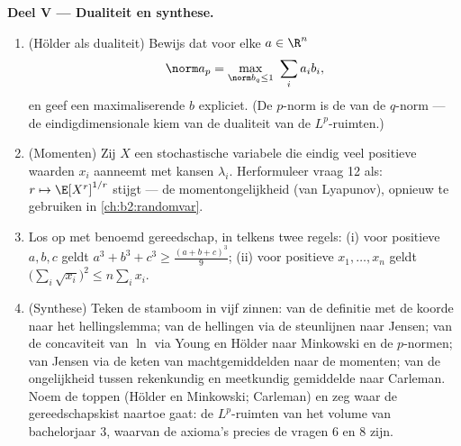 \begin{problem}
\medskip
\noindent\textbf{Deel V --- Dualiteit en synthese.}
\begin{enumerate}[resume]
  \item (Hölder als dualiteit) Bewijs dat voor elke $a \in \R^n$
        \[
        \norm a_p = \max_{\norm b_q \leq 1}\ \sum_i a_ib_i ,
        \]
        en geef een maximaliserende $b$ expliciet. (De $p$-norm is
        de  van de $q$-norm --- de eindigdimensionale kiem
        van de dualiteit van de $L^p$-ruimten.)
  \item (Momenten) Zij $X$ een stochastische variabele die eindig
        veel positieve waarden $x_i$ aanneemt met kansen
        $\lambda_i$. Herformuleer vraag 12 als: $r \mapsto
        \E[X^r]^{1/r}$ stijgt --- de momentongelijkheid (van
        Lyapunov), opnieuw te gebruiken in
        \cref{ch:b2:randomvar}.
  \item Los op met benoemd gereedschap, in telkens twee regels:
        (i) voor positieve $a, b, c$ geldt $a^3 + b^3 + c^3 \geq
        \frac{(a+b+c)^3}{9}$; (ii) voor positieve $x_1, \dots,
        x_n$ geldt $\bigl(\sum_i\sqrt{x_i}\bigr)^2 \leq n\sum_i
        x_i$.
  \item (Synthese) Teken de stamboom in vijf zinnen: van de
        definitie met de koorde naar het hellingslemma; van de
        hellingen via de steunlijnen naar Jensen; van de
        concaviteit van $\ln$ via Young en Hölder naar Minkowski
        en de $p$-normen; van Jensen via de keten van
        machtgemiddelden naar de momenten; van de ongelijkheid
        tussen rekenkundig en meetkundig gemiddelde naar Carleman.
        Noem de toppen (Hölder en Minkowski; Carleman) en zeg
        waar de gereedschapskist naartoe gaat: de
        $L^p$-ruimten van het volume van bachelorjaar 3, waarvan
        de axioma's precies de vragen 6 en 8 zijn.
\end{enumerate}
\end{problem}
